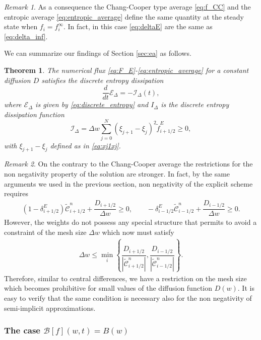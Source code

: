 \documentclass[a4paper]{article}
\newtheorem{theorem}{Theorem}
\theoremstyle{remark}\newtheorem{remark}{Remark}
\newcommand{\B}{\mathcal{B}}
\newcommand{\C}{\mathcal{C}}
\newcommand{\be}{\begin{equation}}
\newcommand{\ee}{\end{equation}}
\begin{document}
 \begin{remark} As a consequence the Chang-Cooper type average \eqref{eq:f_CC} and the entropic average \eqref{eq:entropic_average} define the same quantity at the steady state when $f_i=f_i^{\infty}$. In fact, in this case \eqref{eq:deltaE} are the same as \eqref{eq:delta_inf}.
 \end{remark}
 
We can summarize our findings of Section \ref{sec:ea} as follows.
\begin{theorem}\label{pr:2}
The numerical flux \eqref{eq:F_E}-\eqref{eq:entropic_average} for a constant diffusion $D$ satisfies the discrete entropy dissipation
\be
\dfrac{d}{dt}\mathcal{E}_{\Delta}=- \mathcal I_{\Delta}(t),
\ee
where $\mathcal{E}_{\Delta}$ is given by \eqref{eq:discrete_entropy} 
and $I_{\Delta}$ is the discrete entropy dissipation function 
\be
\mathcal I_{\Delta} = \Delta w \sum_{j=0}^N  (\xi_{j+1}-\xi_j)^2  \tilde{f}^{E}_{i+1/2} \ge 0,
\ee
with $\xi_{j+1}-\xi_j$ defined as in \eqref{eq:xj1xj}.
\end{theorem}

\begin{remark}
On the contrary to the Chang-Cooper average the restrictions for the non negativity property of the solution are stronger. In fact, by the same arguments we used in the previous section, non negativity of the explicit scheme requires 
\be\begin{split}
(1-\delta^E_{i+1/2})\tilde{\C}_{i+1/2}^n+\dfrac{D_{i+1/2}}{\Delta w}\ge 0, \qquad
-\delta^E_{i-1/2}\tilde{\C}_{i-1/2}^n+\dfrac{D_{i-1/2}}{\Delta w}\ge 0.
\end{split}\ee
However, the weights do not possess any special structure that permits to avoid a constraint of the mesh size $\Delta w$ which now must satisfy
\be
\begin{split}
\Delta w \leq 
\min_i\left\{\dfrac{D_{i+1/2}}{|\tilde{\C}_{i+1/2}^n|},\dfrac{D_{i-1/2}}{|\tilde{\C}_{i-1/2}^n|}\right\}.
\end{split}
\ee
Therefore, similar to central differences, we have a restriction on the mesh size which becomes prohibitive for small values of the diffusion function $D(w)$. It is easy to verify that the same condition is necessary also for the non negativity of semi-implicit approximations.
\end{remark}

\subsubsection{The case ${\B}[f](w,t)=B(w)$}
\end{document}
